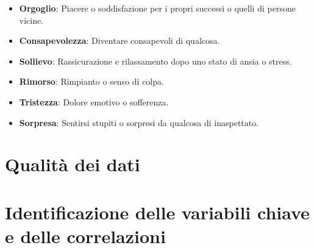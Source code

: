 \documentclass{article}
\begin{document}
\begin{itemize}
    \item \textbf{Orgoglio}: Piacere o soddisfazione per i propri successi o quelli di persone vicine.
    \item \textbf{Consapevolezza}: Diventare consapevoli di qualcosa.
    \item \textbf{Sollievo}: Rassicurazione e rilassamento dopo uno stato di ansia o stress.
    \item \textbf{Rimorso}: Rimpianto o senso di colpa.
    \item \textbf{Tristezza}: Dolore emotivo o sofferenza.
    \item \textbf{Sorpresa}: Sentirsi stupiti o sorpresi da qualcosa di inaspettato.
\end{itemize}

    \section{Qualità dei dati}\label{sec:qualita-dei-dati}
    \section{Identificazione delle variabili chiave e delle correlazioni}\label{sec:identificazione-delle-variabili-chiave-e-delle-correlazioni}
\end{document}
